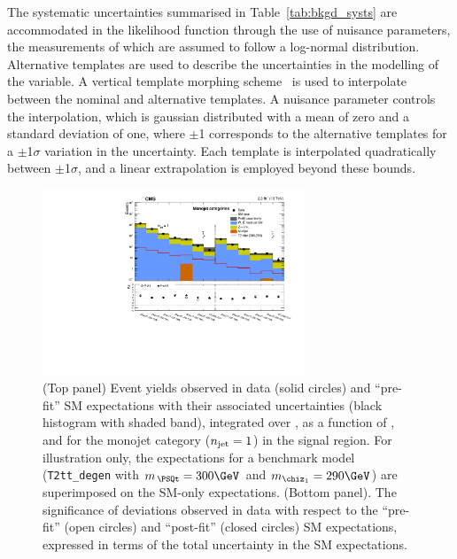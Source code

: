 The systematic uncertainties summarised in Table~\ref{tab:bkgd_systs}
are accommodated in the likelihood function through the use of
nuisance parameters, the measurements of which are assumed to follow a
log-normal distribution. Alternative templates are used to describe
the uncertainties in the modelling of the \HTmiss variable. A vertical
template morphing scheme~\cite{Prosper:1306523} is used to interpolate
between the nominal and alternative \HTmiss templates. A nuisance
parameter controls the interpolation, which is gaussian distributed
with a mean of zero and a standard deviation of one, where $\pm$1
corresponds to the alternative templates for a $\pm$1$\sigma$
variation in the uncertainty. Each template is interpolated
quadratically between $\pm$1$\sigma$, and a linear extrapolation is
employed beyond these bounds.

\begin{figure}[!h]
  \begin{center}
    \includegraphics[width=0.7\textwidth]{figures/result/v1/summaryPlot_Monojet_prefit_overlay_fit_b}
    \caption{(Top panel) Event yields observed in data (solid circles)
      and ``pre-fit'' SM expectations with their associated
      uncertainties (black histogram with shaded band), integrated
      over \HTmiss, as a function of \nb, and \scalht for the monojet
      category ($\njet = 1$) in the signal region. For illustration
      only, the expectations for a benchmark model
      (\texttt{T2tt\_degen} with $m_{\,\PSQt} = 300\GeV$ and
      $m_{\chiz_1} = 290\GeV$) are superimposed on the SM-only
      expectations. (Bottom panel). The significance of deviations
      observed in data with respect to the ``pre-fit'' (open circles)
      and ``post-fit'' (closed circles) SM expectations, expressed in
      terms of the total uncertainty in the SM expectations.  }
    \label{fig:mono}
  \end{center}
\end{figure}


